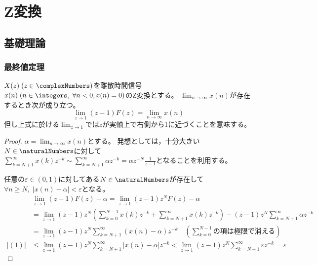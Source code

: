\part{Z変換}
	\chapter{基礎理論}
		\section{最終値定理}
			\begin{shadebox}
				$X(z)\;(z\in\complexNumbers)$を離散時間信号$x(n)\;(n \in \integers,\;\forall n<0,x(n)=0)$のZ変換とする。
				$\lim_{n\to\infty} x(n)$が存在するとき次が成り立つ。
				\[ \lim_{z\to1}(z-1)F(z) = \lim_{n\to\infty} x(n) \]
				但し上式に於ける$\lim_{z\to1}$では$z$が実軸上で右側から1に近づくことを意味する。
			\end{shadebox}
			\begin{proof}
				\quad\par
				$\alpha = \lim_{n\to\infty} x(n)$とする。
				発想としては，十分大きい$N\in\naturalNumbers$に対して$\sum_{k=N+1}^\infty x(k)z^{-k} \sim \sum_{k=N+1}^\infty \alpha z^{-k} = \alpha z^{-N}\frac{1}{z-1}$となることを利用する。
				\par
				任意の$\varepsilon \in (0,1)$に対してある$N\in\naturalNumbers$が存在して$\forall n\geq N,\;|x(n)-\alpha|<\varepsilon$となる。
				\begin{align*}
					\quad &\lim_{z\to1}(z-1)F(z) - \alpha = \lim_{z\to1}(z-1)z^N F(z) - \alpha \\
					&= \lim_{z\to1}(z-1)z^N\left(\sum_{k=0}^{N-1} x(k)z^{-k} + \sum_{k=N+1}^\infty x(k)z^{-k}\right) - (z-1)z^N\sum_{k=N+1}^\infty \alpha z^{-k} \\
					&= \lim_{z\to1}(z-1)z^N \sum_{k=N+1}^\infty (x(n) - \alpha)z^{-k} \quad \left(\sum_{k=0}^{N-1}\text{の項は極限で消える}\right) \tag{1} \\
					|(1)| &\leq \lim_{z\to1}(z-1)z^N \sum_{k=N+1}^\infty |x(n) - \alpha|z^{-k} < \lim_{z\to1}(z-1)z^N \sum_{k=N+1}^\infty \varepsilon z^{-k} = \varepsilon
				\end{align*}
			\end{proof}
